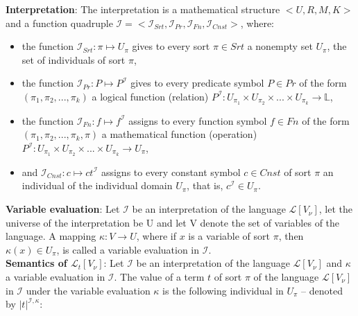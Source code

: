 \documentclass[margin=0px]{article}
\begin{document}
\noindent \textbf{Interpretation}: The interpretation is a mathematical structure $<U, R, M, K>$ and
a function quadruple $\mathcal{I} = <\mathcal{I}_{Srt}, \mathcal{I}_{Pr}, \mathcal{I}_{Fn}, \mathcal{I}_{Cnst}>$,
where:

\begin{itemize}
    \item	the function $\mathcal{I}_{Srt} : \pi \mapsto U_{\pi}$ gives to every sort $\pi \in Srt$
          a nonempty set $U_{\pi}$, the set of individuals of sort $\pi$,

    \item	the function $\mathcal{I}_{Pr} : P \mapsto P^{\mathcal{I}}$ gives to every
          predicate symbol $P \in Pr$ of the form $(\pi_{1}, \pi_{2}, ..., \pi_{k})$ a
          logical function (relation)
          $P^{\mathcal{I}} : U_{\pi_{1}} \times U_{\pi_{2}} \times ... \times U_{\pi_{k}} \to \mathbb{L}$,

    \item	the function $\mathcal{I}_{Fn} : f \mapsto f^{\mathcal{I}}$ assigns to every
          function symbol $f \in Fn$ of the form $(\pi_{1}, \pi_{2}, ..., \pi_{k}, \pi)$ a
          mathematical function (operation)
          $P^{\mathcal{I}} : U_{\pi_{1}} \times U_{\pi_{2}} \times ... \times U_{\pi_{k}} \to U_{\pi}$,

    \item	and $\mathcal{I}_{Cnst} : c \mapsto ct^{\mathcal{I}}$ assigns to every constant symbol
          $c \in Cnst$ of sort $\pi$ an individual of the individual domain $U_{\pi}$,
          that is, $c^{\mathcal{I}} \in U_{\pi}$.
\end{itemize}

\noindent \textbf{Variable evaluation}: Let $\mathcal{I}$ be an interpretation of the language $\mathcal{L}[V_{\nu}]$,
let the universe of the interpretation be U and let V denote the set of variables of the language. A mapping $\kappa : V \to U$,
where if $x$ is a variable of sort $\pi$, then $\kappa(x) \in U_{\pi}$, is called a variable evaluation in $\mathcal{I}$.\\

\noindent \textbf{Semantics of $\mathcal{L}_{t}[V_{\nu}]$}:
Let $\mathcal{I}$ be an interpretation of the language $\mathcal{L}[V_{\nu}]$ and $\kappa$ a variable evaluation in $\mathcal{I}$.
The value of a term $t$ of sort $\pi$ of the language $\mathcal{L}[V_{\nu}]$ in $\mathcal{I}$
under the variable evaluation $\kappa$ is the following individual in $U_{\pi}$ -- denoted by $|t|^{\mathcal{I},\kappa}$:
\end{document}
